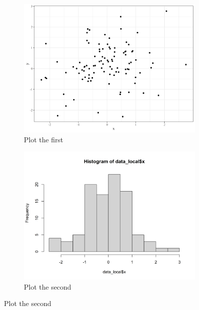 \documentclass[]{elsarticle} %
\begin{document}
\begin{figure}[H]
\begin{multicols}{2}
\begin{figure}[H]
\includegraphics[width = \linewidth]{mandatory_chunk_name-1.png}
\caption{Plot the first}
\label{fig:plotmeans}
\end{figure}

\columnbreak

\begin{figure}[H]
\includegraphics[width = \linewidth]{mandatory_chunk_name-2.png}
\centering
\caption{Plot the second}
\label{fig:histogram}
\end{figure}
\end{multicols}
\end{figure}
\end{document}
